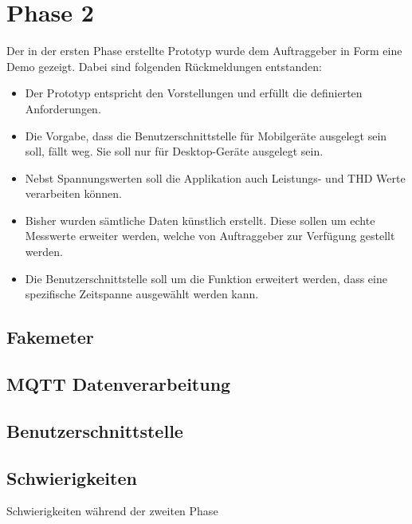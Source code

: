 \section{Phase 2}
Der in der ersten Phase erstellte Prototyp wurde dem Auftraggeber in Form eine Demo gezeigt.
Dabei sind folgenden Rückmeldungen entstanden:
\begin{itemize}
    \item Der Prototyp entspricht den Vorstellungen und erfüllt die definierten Anforderungen.
    \item Die Vorgabe, dass die Benutzerschnittstelle für Mobilgeräte ausgelegt sein soll, fällt weg.
          Sie soll nur für Desktop-Geräte ausgelegt sein.
    \item Nebst Spannungswerten soll die Applikation auch Leistungs- und THD Werte verarbeiten können.
    \item Bisher wurden sämtliche Daten künstlich erstellt.
    Diese sollen um echte Messwerte erweiter werden, welche von Auftraggeber zur Verfügung gestellt werden.
    \item Die Benutzerschnittstelle soll um die Funktion erweitert werden,
    dass eine spezifische Zeitspanne ausgewählt werden kann.

    

\end{itemize}

\subsection{Fakemeter}

\subsection{\ac{MQTT} Datenverarbeitung}

\subsection{Benutzerschnittstelle}

\subsection{Schwierigkeiten}
Schwierigkeiten während der zweiten Phase
